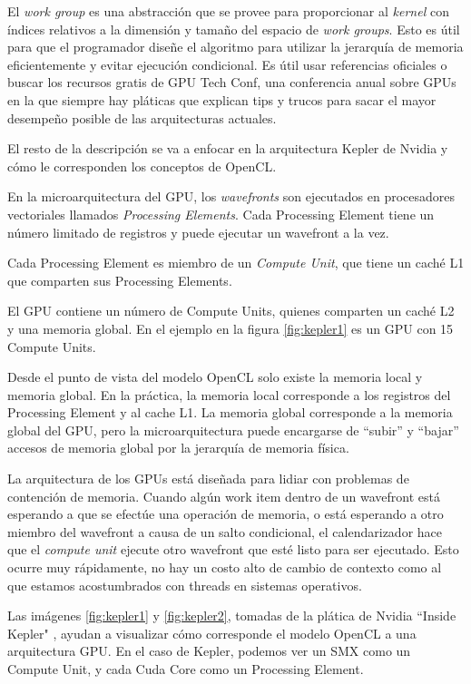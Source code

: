 El \emph{work group} es una abstracción que se provee para proporcionar al
\emph{\gls{kernel}} con índices relativos a la dimensión y tamaño del espacio de
\emph{work groups}. Esto es útil para que el programador diseñe el algoritmo
para utilizar la jerarquía de memoria eficientemente y evitar ejecución
condicional. Es útil usar referencias oficiales \cite{maxwell-tuning} o buscar
los recursos gratis de GPU Tech Conf, una conferencia anual sobre GPUs en la
que siempre hay pláticas que explican tips y trucos para sacar el mayor
desempeño posible de las arquitecturas actuales. \cite{gtc}

El resto de la descripción se va a enfocar en la arquitectura Kepler de Nvidia y cómo le corresponden los conceptos de OpenCL.

En la microarquitectura del GPU, los \emph{wavefronts} son ejecutados en
procesadores vectoriales llamados \emph{Processing Elements}. Cada Processing
Element tiene un número limitado de registros y puede ejecutar un wavefront a la vez.

Cada Processing Element es miembro de un \emph{Compute Unit}, que tiene un caché L1 que comparten sus Processing Elements.

El GPU contiene un número de Compute Units, quienes comparten un caché L2 y una memoria global. En el ejemplo en la figura \ref{fig:kepler1} es un GPU con 15 Compute Units.

Desde el punto de vista del modelo OpenCL solo existe la memoria local y
memoria global. En la práctica, la memoria local corresponde a los registros
del Processing Element y al cache L1. La memoria global corresponde a la
memoria global del GPU, pero la microarquitectura puede encargarse de ``subir''
y ``bajar''  accesos de memoria global por la jerarquía de memoria física.

La arquitectura de los GPUs está diseñada para lidiar con problemas de
contención de memoria. Cuando algún work item dentro de un wavefront está
esperando a que se efectúe una operación de memoria, o está esperando a otro
miembro del wavefront a causa de un salto condicional, el calendarizador hace
que el \emph{compute unit} ejecute otro wavefront que esté listo para ser
ejecutado. Esto ocurre muy rápidamente, no hay un costo alto de cambio de
contexto como al que estamos acostumbrados con threads en sistemas operativos.

Las imágenes \ref{fig:kepler1} y \ref{fig:kepler2}, tomadas de la plática de
Nvidia ``Inside Kepler" \cite{kepler-slides}, ayudan a visualizar cómo
corresponde el modelo OpenCL a una arquitectura GPU. En el caso de Kepler,
podemos ver un SMX como un Compute Unit, y cada Cuda Core como un Processing
Element.

